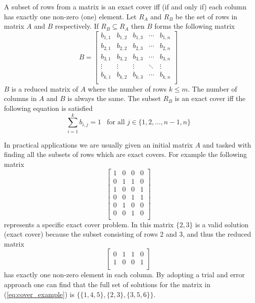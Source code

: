 A subset of rows from a matrix is an exact cover iff (if and only if) each column has exactly one non-zero (one) element.
Let $R_A$ and $R_B$ be the set of rows in matrix $A$ and $B$ respectively.
If $R_B \subseteq R_A$ then $B$ forms the following matrix
\[
	B =
	\left[
	\begin{array}{ccccc}
		b_{1,1} & b_{1,2} & b_{1,3} & \cdots & b_{1,n} \\
		b_{2,1} & b_{2,2} & b_{2,3} & \cdots & b_{2,n} \\
		b_{3,1} & b_{3,2} & b_{3,3} & \cdots & b_{3,n} \\
		\vdots  & \vdots  & \vdots  & \ddots & \vdots  \\
		b_{k,1} & b_{k,2} & b_{k,3} & \cdots & b_{k,n} \\
	\end{array}
	\right]
\]
$B$ is a reduced matrix of $A$ where the number of rows $k \leq m$.
The number of columns in $A$ and $B$ is always the same.
The subset $R_B$ is an exact cover iff the following equation is satisfied
\[
	\sum_{i = 1}^{k} b_{i,j} = 1 \;\;\; \text{for all } j \in \{ 1, 2, \ldots, n-1, n \}
\]

In practical applications we are usually given an initial matrix $A$ and tasked with finding all the subsets of rows which are exact covers.
For example the following matrix
\begin{equation}
	\left[
	\begin{array}{cccc}
		1 & 0 & 0 & 0 \\
		0 & 1 & 1 & 0 \\
		1 & 0 & 0 & 1 \\
		0 & 0 & 1 & 1 \\
		0 & 1 & 0 & 0 \\
		0 & 0 & 1 & 0 \\
	\end{array}
	\right]
	\label{eq:cover_example}
\end{equation}
represents a specific exact cover problem.
In this matrix $\{ 2, 3 \}$ is a valid solution (exact cover) because the subset consisting of rows 2 and 3, and thus the reduced matrix
\[
\left[
\begin{array}{cccc}
	0 & 1 & 1 & 0 \\
	1 & 0 & 0 & 1 \\
\end{array}
\right]
\]
has exactly one non-zero element in each column.
By adopting a trial and error approach one can find that the full set of solutions for the matrix in (\ref{eq:cover_example}) is $\{ \{1, 4, 5 \}, \{ 2, 3\}, \{ 3, 5, 6\} \}$.


